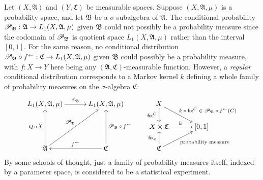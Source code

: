 \documentclass[
twoside=true,
paper=letter,
fontsize=9pt,
pagesize=auto,
leqno,
openany,
headsepline,
overfullrule,
]{scrbook}
\theoremstyle{plain}
\theoremstyle{plain}
\theoremstyle{definition}
\theoremstyle{bfnoteitalic}
\theoremstyle{bfnoteroman}
\newcommand{\sigalg}[1]{\mathfrak{#1}}
\newcommand{\cali}[1]{\mathscr{#1}}
\newcommand{\sfop}[1]{\mathsf{#1}}
\newcommand{\condexpop}[1]{\mathop{\cali{E}\hspace{-1pt}}\nolimits_{#1}}
\newcommand{\condprobop}[1]{\mathop{\cali{P}\hspace{-1pt}}\nolimits_{#1}}
\newcommand{\textsigma}{\hbox{\large{$\sigma$}}\kern-1pt}
\newcommand{\charfunction}[1]{\mathop{{\raisebox{2pt}{$\chi$}}_{#1}}}
\newcommand{\preimage}[1]{\mathop{#1^{\leftarrow}}}
\newcommand{\sigmaalgebra}{\sigalg{A}}
\newcommand{\sigmaalgebraii}{\sigalg{B}}
\newcommand{\sigmaalgebraiii}{\sigalg{C}}
\newcommand{\Lone}{L_1(\measurespace, \sigmaalgebra, \measure)}
\newcommand{\funck}{k}
\newcommand{\function}{f}
\newcommand{\measurespace}{X}
\newcommand{\measurespaceii}{Y}
\newcommand{\mspaceelt}{x}
\newcommand{\measure}{\mu}
\newcommand{\setiii}{C}
\newcommand{\markovkernel}{k}
\newcommand{\fixinthefirst}[1]{\sfop{fix}_{#1}}
\newcommand{\fixinthesecond}[1]{\sfop{fix}^{#1}}
\begin{document}
Let 
$(\measurespace, \sigmaalgebra)$ and 
$(\measurespaceii, \sigmaalgebraiii)$ be measurable spaces.
Suppose 
$(\measurespace,\sigmaalgebra,\measure)$
is a probability space, and let $\sigmaalgebraii$ be a \textsigma-subalgebra of 
$\sigmaalgebra$. 
The conditional probability 
$
\condprobop{\sigmaalgebraii}:
\sigmaalgebra \to 
L_1(\measurespace,\sigmaalgebra,\measure)
$
given $\sigmaalgebraii$ 
could not possibly be a probability measure since the  codomain
of $\condprobop{\sigmaalgebraii}$ is quotient space
$L_1(\measurespace,\sigmaalgebra,\measure)$ rather than the interval $[0,1]$.
For the same reason, no conditional distribution
${\condprobop{\sigmaalgebraii}}\circ \preimage{\function}
: \sigmaalgebraiii \to L_1(\measurespace,\sigmaalgebra,\measure)$
given $\sigmaalgebraii$
could possibly be a probability measure, 
with $\function:\measurespace\to\measurespaceii$ here being any 
$(\sigmaalgebra,\sigmaalgebraiii)$\hyp{}measurable function.
However, a \emph{regular} conditional distribution corresponds to a Markov kernel $\funck$ defining a whole family of probability measures on the
\textsigma-algebra $\sigmaalgebraiii$:
\[
\xymatrix@R=16pt@C=30pt{ 
\Lone \ar[r]^{\condexpop{\sigmaalgebraii}}
& \Lone 
& \measurespace 
\ar[d]_-{\fixinthesecond{\setiii}} 
\ar[dr]^{\qquad\text{$\markovkernel\circ\fixinthesecond{\setiii} \in \condprobop{\sigmaalgebraii}\circ \preimage{\function}(\setiii)$}}
\\
& 
& \measurespace\times\sigmaalgebraiii \ar[r]^{\markovkernel} 
& [0,1] 
\\
\sigmaalgebra 
\ar[uu]^{Q\,\circ\, \charfunction{}} 
\ar[uur]^{\condprobop{\sigmaalgebraii}} 
& \sigmaalgebraiii 
\ar[uu]_{\condprobop{\sigmaalgebraii}\circ \preimage{\function}} 
\ar[l]_{\preimage{\function}}
& \sigmaalgebraiii 
\ar[ur]_{\qquad\text{probability measure}} 
\ar[u]^{\fixinthefirst{\mspaceelt}} 
& 
\\
}
\]
By some schools of thought, just a family
of probability measures itself, indexed by a parameter space, is considered to be a statistical experiment.
\end{document}
